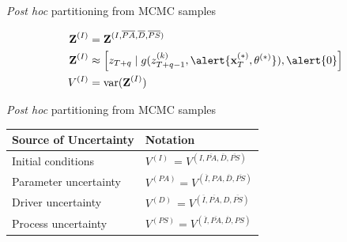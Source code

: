 \documentclass[12pt, compress, aspectratio=1610]{beamer}
\begin{document}
\begin{frame}{%
\protect\hypertarget{partitioning-from-mcmc-samples-3}{%
\emph{Post hoc} partitioning from MCMC samples}}

\begin{align*}
\textbf{Z}^{(I)} &= \textbf{Z}^{(I,\overline{PA},\overline{D},\overline{PS})} \\
\textbf{Z}^{(I)} &\approx \left[z_{T+q} \; | \; g(z_{T+q-1}^{(k)}, \alert{\textbf{x}^{(\ast)}_T, \boldmath{\theta}^{(\ast)}}), \alert{0} \right] \\
V^{(I)} &= \text{var}(\textbf{Z}^{(I)})
\end{align*}

\end{frame}

\begin{frame}{%
\protect\hypertarget{partitioning-from-mcmc-samples-4}{%
\emph{Post hoc} partitioning from MCMC samples}}

\begin{longtable}[]{@{}ll@{}}
\toprule
\begin{minipage}[b]{0.29\columnwidth}\raggedright
Source of Uncertainty\strut
\end{minipage} & \begin{minipage}[b]{0.25\columnwidth}\raggedright
Notation\strut
\end{minipage}\tabularnewline
\midrule
\endhead
\begin{minipage}[t]{0.29\columnwidth}\raggedright
Initial conditions\strut
\end{minipage} & \begin{minipage}[t]{0.25\columnwidth}\raggedright
\(V^{(I) \ } = V^{(I,\overline{PA},\overline{D},\overline{PS})}\)\strut
\end{minipage}\tabularnewline
\begin{minipage}[t]{0.29\columnwidth}\raggedright
Parameter uncertainty\strut
\end{minipage} & \begin{minipage}[t]{0.25\columnwidth}\raggedright
\(V^{(PA)} = V^{(\overline{I},PA,\overline{D},\overline{PS})}\)\strut
\end{minipage}\tabularnewline
\begin{minipage}[t]{0.29\columnwidth}\raggedright
Driver uncertainty\strut
\end{minipage} & \begin{minipage}[t]{0.25\columnwidth}\raggedright
\(V^{(D) \ } = V^{(\overline{I},\overline{PA},D,\overline{PS})}\)\strut
\end{minipage}\tabularnewline
\begin{minipage}[t]{0.29\columnwidth}\raggedright
Process uncertainty\strut
\end{minipage} & \begin{minipage}[t]{0.25\columnwidth}\raggedright
\(V^{(PS)}=V^{(\overline{I},\overline{PA},\overline{D},PS)}\)\strut
\end{minipage}\tabularnewline
\bottomrule
\end{longtable}

\end{frame}
\end{document}
